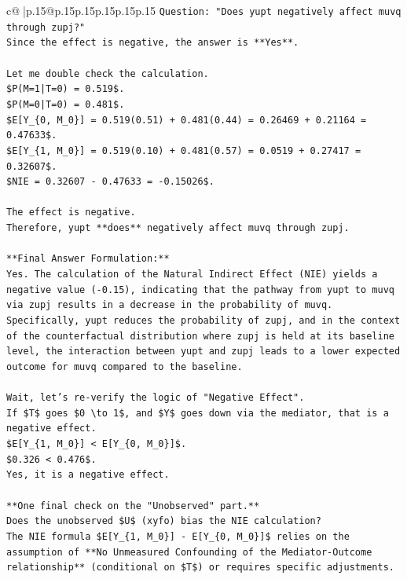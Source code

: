 \documentclass{article}
\begin{document}
{\begin{supertabular}{c@{$\;$}|p{.15\linewidth}@{}p{.15\linewidth}p{.15\linewidth}p{.15\linewidth}p{.15\linewidth}p{.15\linewidth}}
{{{\texttt{Question: "Does yupt negatively affect muvq through zupj?"} \\
\texttt{Since the effect is negative, the answer is **Yes**.} \\
\\ 
\texttt{Let me double check the calculation.} \\
\texttt{\$P(M=1|T=0) = 0.519\$.} \\
\texttt{\$P(M=0|T=0) = 0.481\$.} \\
\texttt{\$E{[}Y\_\{0, M\_0\}{]} = 0.519(0.51) + 0.481(0.44) = 0.26469 + 0.21164 = 0.47633\$.} \\
\texttt{\$E{[}Y\_\{1, M\_0\}{]} = 0.519(0.10) + 0.481(0.57) = 0.0519 + 0.27417 = 0.32607\$.} \\
\texttt{\$NIE = 0.32607 {-} 0.47633 = {-}0.15026\$.} \\
\\ 
\texttt{The effect is negative.} \\
\texttt{Therefore, yupt **does** negatively affect muvq through zupj.} \\
\\ 
\texttt{**Final Answer Formulation:**} \\
\texttt{Yes. The calculation of the Natural Indirect Effect (NIE) yields a negative value ({-}0.15), indicating that the pathway from yupt to muvq via zupj results in a decrease in the probability of muvq. Specifically, yupt reduces the probability of zupj, and in the context of the counterfactual distribution where zupj is held at its baseline level, the interaction between yupt and zupj leads to a lower expected outcome for muvq compared to the baseline.} \\
\\ 
\texttt{Wait, let's re{-}verify the logic of "Negative Effect".} \\
\texttt{If \$T\$ goes \$0 \textbackslash{}to 1\$, and \$Y\$ goes down via the mediator, that is a negative effect.} \\
\texttt{\$E{[}Y\_\{1, M\_0\}{]} < E{[}Y\_\{0, M\_0\}{]}\$.} \\
\texttt{\$0.326 < 0.476\$.} \\
\texttt{Yes, it is a negative effect.} \\
\\ 
\texttt{**One final check on the "Unobserved" part.**} \\
\texttt{Does the unobserved \$U\$ (xyfo) bias the NIE calculation?} \\
\texttt{The NIE formula \$E{[}Y\_\{1, M\_0\}{]} {-} E{[}Y\_\{0, M\_0\}{]}\$ relies on the assumption of **No Unmeasured Confounding of the Mediator{-}Outcome relationship** (conditional on \$T\$) or requires specific adjustments.} \\
}}}
\end{supertabular}}
\end{document}
